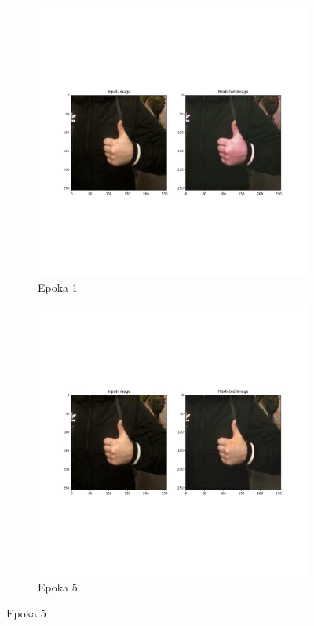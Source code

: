 \documentclass[12pt]{article}
\begin{document}
\begin{sloppypar}
{{    \begin{figure}
      \begin{subfigure}{.5\textwidth}
        \centering
        \includegraphics[width=.8\linewidth]{cycle-gan/epoch-1.jpg}
        \caption{Epoka 1}
        \label{fig:cg-1}
      \end{subfigure}%
      \begin{subfigure}{.5\textwidth}
        \centering
        \includegraphics[width=.8\linewidth]{cycle-gan/epoch-5.jpg}
        \caption{Epoka 5}
        \label{fig:cg-5}
      \end{subfigure}
    \end{figure}
}}
\end{sloppypar}
\end{document}
